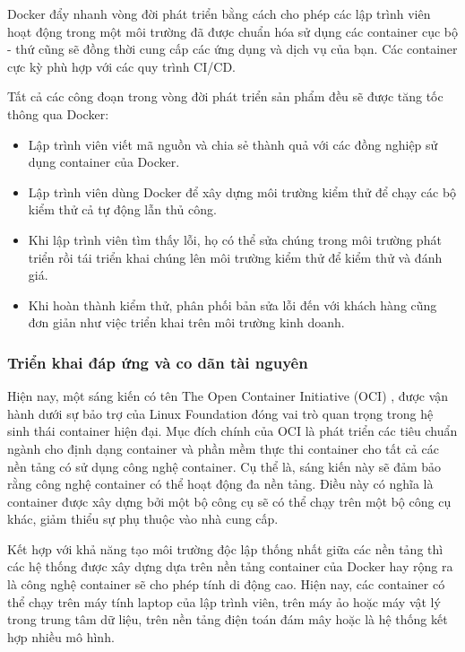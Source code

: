 Docker đẩy nhanh vòng đời phát triển bằng cách cho phép các lập trình viên hoạt động trong một môi trường đã được chuẩn hóa sử dụng các container cục bộ - thứ cũng sẽ đồng thời cung cấp các ứng dụng và dịch vụ của bạn. Các container cực kỳ phù hợp với các quy trình CI/CD.

Tất cả các công đoạn trong vòng đời phát triển sản phẩm đều sẽ được tăng tốc thông qua Docker:
\begin{itemize}
    \item Lập trình viên viết mã nguồn và chia sẻ thành quả với các đồng nghiệp sử dụng container của Docker.
    \item Lập trình viên dùng Docker để xây dựng môi trường kiểm thử để chạy các bộ kiểm thử cả tự động lẫn thủ công.
    \item Khi lập trình viên tìm thấy lỗi, họ có thể sửa chúng trong môi trường phát triển rồi tái triển khai chúng lên môi trường kiểm thử để kiểm thử và đánh giá.
    \item Khi hoàn thành kiểm thử, phân phối bản sửa lỗi đến với khách hàng cũng đơn giản như việc triển khai trên môi trường kinh doanh.
\end{itemize}

\subsubsection{Triển khai đáp ứng và co dãn tài nguyên}

Hiện nay, một sáng kiến có tên The Open Container Initiative (OCI) \autocite{opencontainerinitiative}, được vận hành dưới sự bảo trợ của Linux Foundation \autocite{linuxfoundation} %
đóng vai trò quan trọng trong hệ sinh thái container hiện đại. Mục đích chính của OCI là phát triển các tiêu chuẩn ngành cho định dạng container và phần mềm thực thi container cho tất cả các nền tảng có sử dụng công nghệ container. Cụ thể là, sáng kiến này sẽ đảm bảo rằng công nghệ container có thể hoạt động đa nền tảng. Điều này có nghĩa là container được xây dựng bởi một bộ công cụ sẽ có thể chạy trên một bộ công cụ khác, giảm thiểu sự phụ thuộc vào nhà cung cấp.

Kết hợp với khả năng tạo môi trường độc lập thống nhất giữa các nền tảng thì các hệ thống được xây dựng dựa trên nền tảng container của Docker hay rộng ra là công nghệ container sẽ cho phép tính di động cao. Hiện nay, các container có thể chạy trên máy tính laptop của lập trình viên, trên máy ảo hoặc máy vật lý trong trung tâm dữ liệu, trên nền tảng điện toán đám mây hoặc là hệ thống kết hợp nhiều mô hình.

